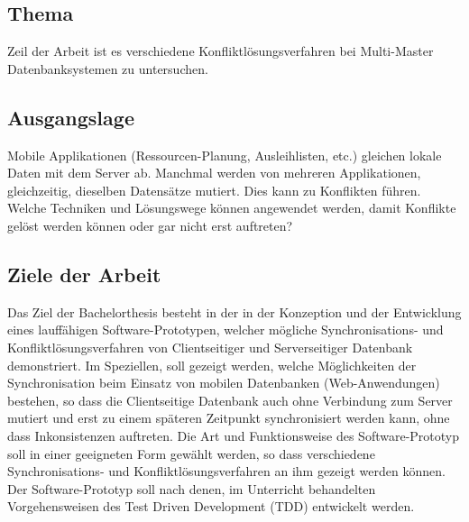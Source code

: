 \documentclass[oneside,11pt,parskip=half,ngerman]{scrreprt}
\begin{document}


\subsection{Thema}\label{thema}

Zeil der Arbeit ist es verschiedene Konfliktlösungsverfahren bei
Multi-Master Datenbanksystemen zu untersuchen.

\subsection{Ausgangslage}\label{ausgangslage}

Mobile Applikationen (Ressourcen-Planung, Ausleihlisten, etc.) gleichen
lokale Daten mit dem Server ab. Manchmal werden von mehreren
Applikationen, gleichzeitig, dieselben Datensätze mutiert. Dies kann zu
Konflikten führen. Welche Techniken und Lösungswege können angewendet
werden, damit Konflikte gelöst werden können oder gar nicht erst
auftreten?

\subsection{Ziele der Arbeit}\label{ziele-der-arbeit}

Das Ziel der Bachelorthesis besteht in der in der Konzeption und der
Entwicklung eines lauffähigen Software-Prototypen, welcher mögliche
Synchronisations- und Konfliktlösungsverfahren von Clientseitiger und
Serverseitiger Datenbank demonstriert. Im Speziellen, soll gezeigt
werden, welche Möglichkeiten der Synchronisation beim Einsatz von
mobilen Datenbanken (Web-Anwendungen) bestehen, so dass die
Clientseitige Datenbank auch ohne Verbindung zum Server mutiert und erst
zu einem späteren Zeitpunkt synchronisiert werden kann, ohne dass
Inkonsistenzen auftreten. Die Art und Funktionsweise des
Software-Prototyp soll in einer geeigneten Form gewählt werden, so dass
verschiedene Synchronisations- und Konfliktlösungsverfahren an ihm
gezeigt werden können. Der Software-Prototyp soll nach denen, im
Unterricht behandelten Vorgehensweisen des Test Driven Development (TDD)
entwickelt werden.
\end{document}
